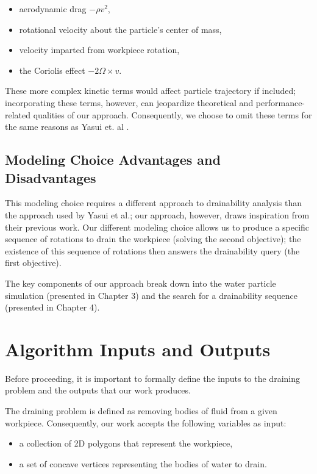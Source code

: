 \begin{itemize}
\item aerodynamic drag $-\rho v^2$,
\item rotational velocity about the particle's center of mass,
\item velocity imparted from workpiece rotation,
\item the Coriolis effect $-2 \Omega \times v$.
\end{itemize}

These more complex kinetic terms would affect particle trajectory if included; incorporating these terms, however, can jeopardize theoretical and performance-related qualities of our approach. Consequently, we choose to omit these terms for the same reasons as Yasui et. al \cite{Yasui2011}.

	\subsection{Modeling Choice Advantages and Disadvantages}

This modeling choice requires a different approach to drainability analysis than the approach used by Yasui et al.; our approach, however, draws inspiration from their previous work. Our different modeling choice allows us to produce a specific sequence of rotations to drain the workpiece (solving the second objective); the existence of this sequence of rotations then answers the drainability query (the first objective).

The key components of our approach break down into the water particle simulation (presented in Chapter 3) and the search for a drainability sequence (presented in Chapter 4).

\section{Algorithm Inputs and Outputs}

Before proceeding, it is important to formally define the inputs to the draining problem and the outputs that our work produces.

The draining problem is defined as removing bodies of fluid from a given workpiece. Consequently, our work accepts the following variables as input:

\begin{itemize}
\item a collection of 2D polygons that represent the workpiece,
\item a set of concave vertices representing the bodies of water to drain.
\end{itemize}

